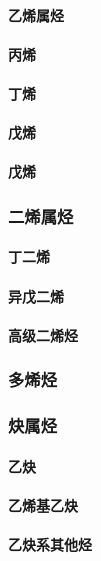 \documentclass[UTF8]{../03-Chemistry}
\begin{document}
            \paragraph{乙烯属烃}
            \paragraph{丙烯}
            \paragraph{丁烯}
            \paragraph{戊烯}
            \paragraph{戊烯}
        \subsubsection{二烯属烃}
            \paragraph{丁二烯}
            \paragraph{异戊二烯}
            \paragraph{高级二烯烃}
        \subsubsection{多烯烃}
        \subsubsection{炔属烃}
            \paragraph{乙炔}
            \paragraph{乙烯基乙炔}
            \paragraph{乙炔系其他烃}
\end{document}
